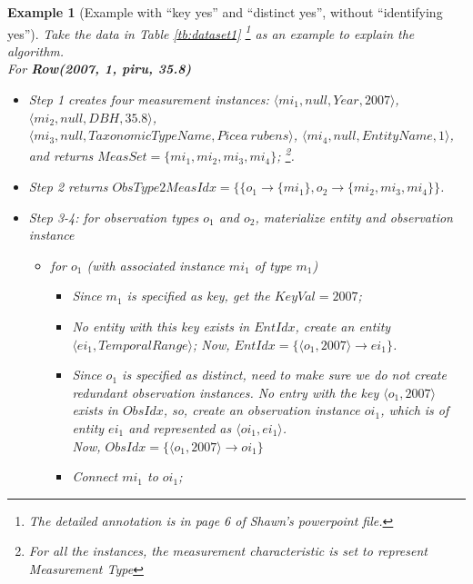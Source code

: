 \documentclass[10pt]{article}
\newtheorem{example}{Example}[section]
\begin{document}
\begin{example} [Example with ``key yes'' and ``distinct yes'', without ``identifying yes'']
Take the data in Table \ref{tb:dataset1} \footnote{The detailed annotation is in page 6 of Shawn's powerpoint file.}
as an example to explain the algorithm. \\
For {\bf Row(2007, 1, piru, 35.8)}
\begin{itemize}
\item Step 1 creates four measurement instances: 
$\langle mi_1, null, Year, 2007\rangle$, $\langle mi_2, null, DBH, 35.8\rangle$, \\
$\langle mi_3, null, TaxonomicTypeName, Picea~rubens\rangle$, $\langle mi_4, null, EntityName, 1\rangle$,\\
and returns $MeasSet = \{mi_1, mi_2, mi_3, mi_4\}$;
\footnote{For all the instances, the measurement characteristic is set to represent Measurement Type}.

\item Step 2 returns $ObsType2MeasIdx = \{\{o_1\rightarrow \{mi_1\}, o_2 \rightarrow \{mi_2, mi_3, mi_4\}\}$. 
 \item Step 3-4: for  observation types $o_1$ and $o_2$,  materialize entity and observation instance
    \begin{itemize}
    \item for $o_1$ (with associated instance $mi_1$ of type $m_1$)
    \begin{itemize}
        \item Since $m_1$ is specified as key, get the $KeyVal=2007$;
        \item No entity with this key exists in $EntIdx$, create an entity $\langle ei_1, TemporalRange\rangle$; Now, $EntIdx=\{\langle o_1, 2007\rangle\rightarrow ei_1\}$.
        \item Since $o_1$ is specified as {\em distinct}, need to make sure we do not create redundant observation instances. No entry with the key $\langle o_1, 2007\rangle$ exists in $ObsIdx$, so, create an observation instance $oi_1$, which is of entity $ei_1$ and represented as $\langle oi_1, ei_1\rangle$. \\
	Now, $ObsIdx=\{\langle o_1, 2007 \rangle \rightarrow oi_1\}$
        \item Connect $mi_1$ to $oi_1$;
    \end{itemize}
    

\end{itemize}
\end{itemize}
\end{example}
\end{document}
